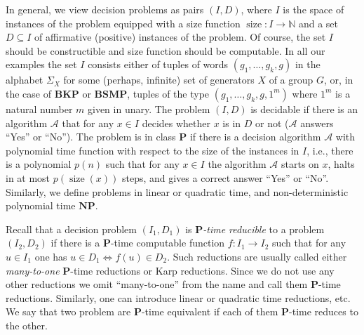 \documentclass[11pt]{amsart}
\theoremstyle{definition}
\DeclareMathOperator{\size}{{size}}
\def\P{{\mathbf{P}}}
\def\NP{{\mathbf{NP}}}
\def\BSMP{{\mathbf{BSMP}}}
\def\BKP{{\mathbf{BKP}}}
\begin{document}
In general, we view decision problems as pairs $(I,D)$, where $I$ is the space of instances of
the problem equipped with a  size function $\size: I \to \mathbb N$ and
a set $D \subseteq I$ of affirmative (positive) instances of the problem.
Of course, the set $I$ should be constructible and size function  should be computable.
In all our examples the set $I$ consists either of tuples of words $(g_1, \ldots,g_k,g)$ in
the   alphabet $\Sigma_X$ for some (perhaps, infinite) set of generators $X$ of a group $G$, or,
in the case of  $\BKP$  or $\BSMP$,
tuples of the type  $(g_1, \ldots,g_k,g,1^m)$ where $1^m$ is
a natural number $m$ given in unary.
The problem $(I,D)$ is decidable if there is an algorithm ${\mathcal A}$
that for any $x \in I$ decides whether  $x$ is in $D$ or not (${\mathcal A}$  answers ``Yes'' or ``No'').
The problem is in class $\P$ if there is a decision algorithm ${\mathcal A}$
with polynomial  time function with respect to the size of the instances in $I$, i.e.,
there is a polynomial $p(n)$ such that for any $x \in I$ the algorithm ${\mathcal A}$ starts on $x$,
halts in at most $p(\size(x))$ steps, and gives a correct answer ``Yes'' or ``No''.
Similarly, we define problems in linear  or quadratic time, and non-deterministic polynomial time $\NP$.


Recall that a decision problem $(I_1,D_1)$ is  {\em $\P$-time  reducible}
to  a problem $(I_2,D_2)$ if there is a $\P$-time computable function
$f:I_1  \to I_2$  such that for any $u \in I_1$ one has $u \in D_1 \Longleftrightarrow f(u) \in D_2$.
Such reductions are usually called either {\em many-to-one} $\P$-time reductions or Karp reductions.
Since we do not use any other reductions we omit ``many-to-one'' from the name and call them $\P$-time reductions.  Similarly, one can introduce linear or quadratic time reductions, etc. We say that two problem are $\P$-time equivalent if each of them $\P$-time reduces to the other.
\end{document}
